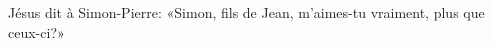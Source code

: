 \encetemps Jésus dit à Simon-Pierre:
	«Simon, fils de Jean, m’aimes-tu vraiment, plus que ceux-ci?»
